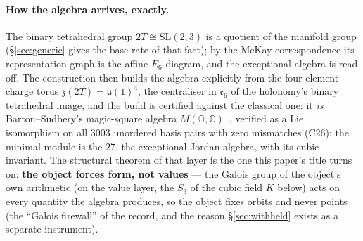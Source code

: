 \documentclass[11pt,a4paper]{article}
\theoremstyle{definition}
\theoremstyle{remark}
\begin{document}
\paragraph{How the algebra arrives, exactly.} The binary tetrahedral group $2T \cong \mathrm{SL}(2,3)$ is a quotient of the
manifold group (\S\ref{sec:generic} gives the base rate of that fact); by the McKay correspondence its representation graph
is the affine $E_6$ diagram, and the exceptional algebra is read off. The construction then builds the algebra explicitly
from the four-element charge torus $\mathfrak{z}(2T) = \mathfrak{u}(1)^4$, the centraliser in $\mathfrak{e}_6$ of the
holonomy's binary tetrahedral image, and the build is certified against the classical one: it \emph{is}
Barton--Sudbery's magic-square algebra $M(\mathbb{O},\mathbb{C})$~\cite{bartonsudbery}, verified as a Lie isomorphism on all
$3003$ unordered basis pairs with zero mismatches (C26); the minimal module is the $27$, the exceptional Jordan algebra, with its cubic invariant.
The structural theorem of that layer is the one this paper's title turns on: \textbf{the object forces form, not values} --- the
Galois group of the object's own arithmetic (on the value layer, the $S_3$ of the cubic field $K$ below) acts on every quantity
the algebra produces, so the object fixes orbits and never points (the ``Galois firewall'' of the record, and the reason
\S\ref{sec:withheld} exists as a separate instrument).
\end{document}
